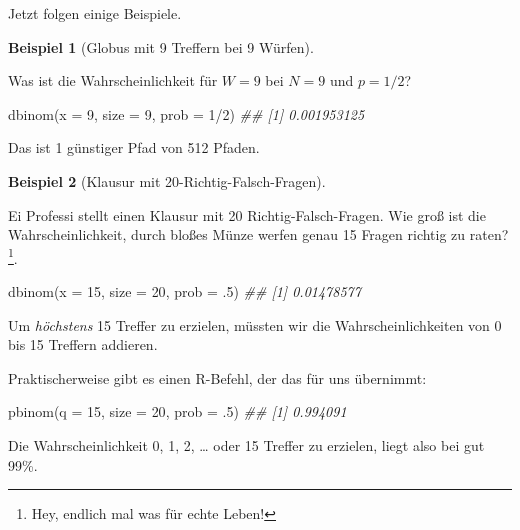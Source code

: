 \documentclass[
  a4paper,
  DIV=11]{scrreprt}
\newenvironment{Shaded}{\begin{snugshade}}{\end{snugshade}}
\newcommand{\AttributeTok}[1]{\textcolor[rgb]{0.40,0.45,0.13}{#1}}
\newcommand{\DecValTok}[1]{\textcolor[rgb]{0.68,0.00,0.00}{#1}}
\newcommand{\DocumentationTok}[1]{\textcolor[rgb]{0.37,0.37,0.37}{\textit{#1}}}
\newcommand{\FunctionTok}[1]{\textcolor[rgb]{0.28,0.35,0.67}{#1}}
\newcommand{\NormalTok}[1]{\textcolor[rgb]{0.00,0.23,0.31}{#1}}
\newcommand{\SpecialCharTok}[1]{\textcolor[rgb]{0.37,0.37,0.37}{#1}}
\theoremstyle{definition}
\newtheorem{example}{Beispiel}[chapter]
\theoremstyle{remark}
\begin{document}
Jetzt folgen einige Beispiele.

\leavevmode{}%
\begin{example}[Globus mit 9 Treffern bei 9 Würfen]\label{exm-globus2}

Was ist die Wahrscheinlichkeit für \(W=9\) bei \(N=9\) und \(p=1/2\)?

\begin{Shaded}
\begin{Highlighting}[]
\FunctionTok{dbinom}\NormalTok{(}\AttributeTok{x =} \DecValTok{9}\NormalTok{, }\AttributeTok{size =} \DecValTok{9}\NormalTok{, }\AttributeTok{prob =} \DecValTok{1}\SpecialCharTok{/}\DecValTok{2}\NormalTok{)}
\DocumentationTok{\#\# [1] 0.001953125}
\end{Highlighting}
\end{Shaded}

Das ist 1 günstiger Pfad von 512 Pfaden.

\end{example}

\leavevmode{}%
\begin{example}[Klausur mit 20-Richtig-Falsch-Fragen]\label{exm-globus3}

Ei Professi stellt einen Klausur mit 20 Richtig-Falsch-Fragen. Wie groß
ist die Wahrscheinlichkeit, durch bloßes Münze werfen genau 15 Fragen
richtig zu raten?\footnote{Hey, endlich mal was für echte Leben!}.

\begin{Shaded}
\begin{Highlighting}[]
\FunctionTok{dbinom}\NormalTok{(}\AttributeTok{x =} \DecValTok{15}\NormalTok{, }\AttributeTok{size =} \DecValTok{20}\NormalTok{, }\AttributeTok{prob =}\NormalTok{ .}\DecValTok{5}\NormalTok{)}
\DocumentationTok{\#\# [1] 0.01478577}
\end{Highlighting}
\end{Shaded}

Um \emph{höchstens} 15 Treffer zu erzielen, müssten wir die
Wahrscheinlichkeiten von 0 bis 15 Treffern addieren.

Praktischerweise gibt es einen R-Befehl, der das für uns übernimmt:

\begin{Shaded}
\begin{Highlighting}[]
\FunctionTok{pbinom}\NormalTok{(}\AttributeTok{q =} \DecValTok{15}\NormalTok{, }\AttributeTok{size =} \DecValTok{20}\NormalTok{, }\AttributeTok{prob =}\NormalTok{ .}\DecValTok{5}\NormalTok{)}
\DocumentationTok{\#\# [1] 0.994091}
\end{Highlighting}
\end{Shaded}

Die Wahrscheinlichkeit 0, 1, 2, \ldots{} oder 15 Treffer zu erzielen,
liegt also bei gut 99\%.

\end{example}
\end{document}
